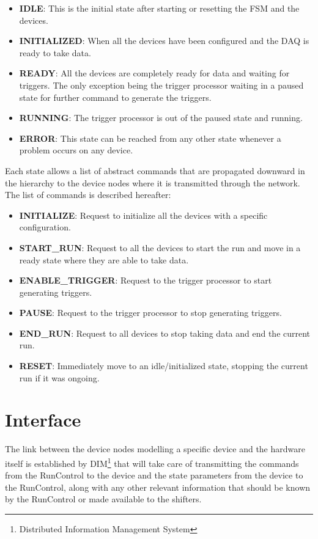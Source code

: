\documentclass[a4paper]{article}
\begin{document}
\begin{itemize}
	\item \textbf{IDLE}: This is the initial state after starting or resetting the FSM and the devices.
	\item \textbf{INITIALIZED}: When all the devices have been configured and the DAQ is ready to take
	data.
	\item \textbf{READY}: All the devices are completely ready for data and waiting for triggers. The
	only exception being the trigger processor waiting in a paused state for further command to
	generate the triggers.
	\item \textbf{RUNNING}: The trigger processor is out of the paused state and running.
	\item \textbf{ERROR}: This state can be reached from any other state whenever a problem occurs on
	any device.
\end{itemize}

Each state allows a list of abstract commands that are propagated downward in the hierarchy to
the device nodes where it is transmitted through the network. The list of commands is described
hereafter:

\begin{itemize}
	\item \textbf{INITIALIZE}: Request to initialize all the devices with a specific configuration.
	\item \textbf{START\_RUN}: Request to all the devices to start the run and move in a ready state
	where they are able to take data.
	\item \textbf{ENABLE\_TRIGGER}: Request to the trigger processor to start generating triggers.
	\item \textbf{PAUSE}: Request to the trigger processor to stop generating triggers.
	\item \textbf{END\_RUN}: Request to all devices to stop taking data and end the current run.
	\item \textbf{RESET}: Immediately move to an idle/initialized state, stopping the current run if it
	was ongoing.
\end{itemize}

\section{Interface}
The link between the device nodes modelling a specific device and the hardware itself is
established by DIM\cite{biblio:DIM}\footnote{Distributed Information Management System} that will
take care of transmitting the commands from the RunControl to the device and the state parameters from the
device to the RunControl, along with any other relevant information that should be known by the
RunControl or made available to the shifters.
\end{document}
